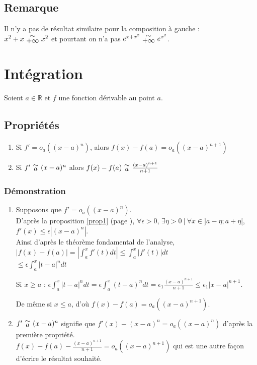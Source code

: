 \documentclass[a4paper,10pt]{book} %
\newcommand{\R}{\mathbb{R}}
\newcommand{\equi}[1]{\renewcommand{\arraystretch}{0.3}~\begin{matrix}\sim\\#1\end{matrix}~\renewcommand{\arraystretch}{1}}
\newcommand{\abs}[1]{\left|#1\right|}
\newcommand{\tq}{~|~}
\begin{document}
\subsection{Remarque}
Il n'y a pas de résultat similaire pour la composition à gauche :\\
$x^2+x \equi{+\infty} x^2$ et pourtant on n'a pas $e^{x+x^2} \equi{+\infty} e^{x^2}$.

\newpage

\section{Intégration}
Soient $a\in\R$ et $f$ une fonction dérivable au point $a$.

\subsection{Propriétés}
\begin{enumerate}
\item Si $f'=o_a((x-a)^n)$, alors $f(x)-f(a)=o_a((x-a)^{n+1})$
\item Si $f'\equi{a}(x-a)^n$ alors $f(x)-f(a)\equi{a}\frac{(x-a)^{n+1}}{n+1}$
\end{enumerate}

\subsubsection{Démonstration}
\begin{enumerate}
\item Supposons que $f'=o_a((x-a)^n)$.\\
D'après la proposition \ref{prop1} (page \pageref{prop1}), $\forall \epsilon>0$, $\exists \eta>0 \tq \forall x\in ]a-\eta ;a+\eta[$, $f'(x)\leq \epsilon|(x-a)^n|$.\\
Ainsi d'après le théorème fondamental de l'analyse, $\displaystyle\abs{f(x)-f(a)}=\abs{\int_{a}^{x}f'(t)dt}\leq \int_{a}^{x}\abs{f'(t)}dt$\\
\hspace*{12.15cm}$\displaystyle\leq \epsilon\int_{a}^{x}\abs{t-a}^ndt$

Si $x\geq a$ : $\displaystyle\epsilon\int_{a}^{x}\abs{t-a}^ndt=\epsilon \int_{a}^{x}(t-a)^ndt=\epsilon_1\frac{(x-a)^{n+1}}{n+1}\leq \epsilon_1\abs{x-a}^{n+1}$.

De même si $x\leq a$, d'où $f(x)-f(a)=o_a((x-a)^{n+1})$.\\

\item $f'\equi{a}(x-a)^n$ signifie que $f'(x)-(x-a)^n=o_a((x-a)^n)$ d'après la première propriété.\\

$\displaystyle f(x)-f(a)-\frac{(x-a)^{n+1}}{n+1}=o_a((x-a)^{n+1})$
qui est une autre façon d'écrire le résultat souhaité.
\end{enumerate}
\end{document}

